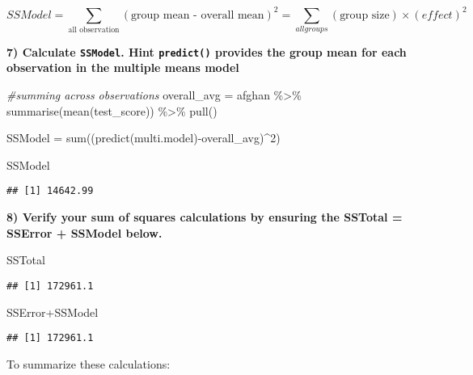 \documentclass[
]{article}
\newenvironment{Shaded}{\begin{snugshade}}{\end{snugshade}}
\newcommand{\CommentTok}[1]{\textcolor[rgb]{0.56,0.35,0.01}{\textit{#1}}}
\newcommand{\DecValTok}[1]{\textcolor[rgb]{0.00,0.00,0.81}{#1}}
\newcommand{\FunctionTok}[1]{\textcolor[rgb]{0.00,0.00,0.00}{#1}}
\newcommand{\NormalTok}[1]{#1}
\newcommand{\OtherTok}[1]{\textcolor[rgb]{0.56,0.35,0.01}{#1}}
\newcommand{\SpecialCharTok}[1]{\textcolor[rgb]{0.00,0.00,0.00}{#1}}
\begin{document}
\[SSModel = \sum_{\text{all observation}}(\text{group mean - overall mean})^2 = \sum_{all groups}(\text{group size})\times(effect)^2\]

\textbf{7) Calculate \texttt{SSModel}. Hint \texttt{predict()} provides
the group mean for each observation in the multiple means model }
\vspace{1in}

\begin{Shaded}
\begin{Highlighting}[]
\CommentTok{\#summing across observations}
\NormalTok{overall\_avg }\OtherTok{=}\NormalTok{ afghan }\SpecialCharTok{\%\textgreater{}\%} \FunctionTok{summarise}\NormalTok{(}\FunctionTok{mean}\NormalTok{(test\_score)) }\SpecialCharTok{\%\textgreater{}\%} \FunctionTok{pull}\NormalTok{()}

\NormalTok{SSModel }\OtherTok{=} \FunctionTok{sum}\NormalTok{((}\FunctionTok{predict}\NormalTok{(multi.model)}\SpecialCharTok{{-}}\NormalTok{overall\_avg)}\SpecialCharTok{\^{}}\DecValTok{2}\NormalTok{)}

\NormalTok{SSModel}
\end{Highlighting}
\end{Shaded}

\begin{verbatim}
## [1] 14642.99
\end{verbatim}

\textbf{8) Verify your sum of squares calculations by ensuring the
SSTotal = SSError + SSModel below.}

\begin{Shaded}
\begin{Highlighting}[]
\NormalTok{SSTotal}
\end{Highlighting}
\end{Shaded}

\begin{verbatim}
## [1] 172961.1
\end{verbatim}

\begin{Shaded}
\begin{Highlighting}[]
\NormalTok{SSError}\SpecialCharTok{+}\NormalTok{SSModel}
\end{Highlighting}
\end{Shaded}

\begin{verbatim}
## [1] 172961.1
\end{verbatim}

To summarize these calculations:
\end{document}
